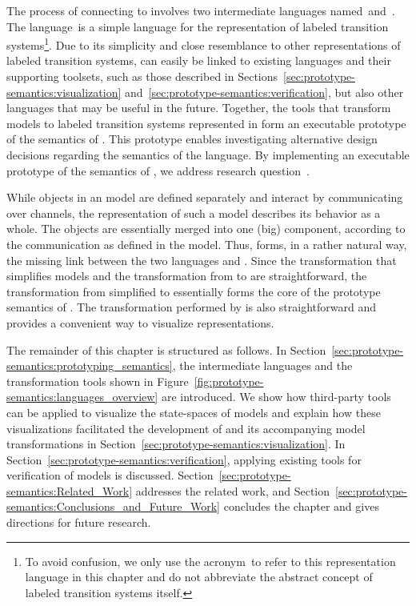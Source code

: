 The process of connecting \SLCO to \DOT involves two intermediate languages named~\CS and~\LTS.
The language~\LTS is a simple language for the representation of labeled transition systems\footnote{To avoid confusion, we only use the acronym~\LTS to refer to this representation language in this chapter and do not abbreviate the abstract concept of labeled transition systems itself.}.
Due to its simplicity and close resemblance to other representations of labeled transition systems, \LTS can easily be linked to existing languages and their supporting toolsets, such as those described in Sections~\ref{sec:prototype-semantics:visualization} and~\ref{sec:prototype-semantics:verification}, but also other languages that may be useful in the future.
Together, the tools that transform \SLCO models to labeled transition systems represented in \LTS form an executable prototype of the semantics of \SLCO.
This prototype enables investigating alternative design decisions regarding the semantics of the language.
By implementing an executable prototype of the semantics of \SLCO, we address research question~.

\RQThree

While objects in an \SLCO model are defined separately and interact by communicating over channels, the \CS representation of such a model describes its behavior as a whole.
The objects are essentially merged into one (big) component, according to the communication as defined in the \SLCO model.
Thus, \CS forms, in a rather natural way, the missing link between the two languages \SLCO and \LTS.
Since the transformation that simplifies \SLCO models and the transformation from \CS to \LTS are straightforward, the transformation from simplified \SLCO to \CS essentially forms the core of the prototype semantics of \SLCO.
The transformation performed by \CStoDot is also straightforward and provides a convenient way to visualize \CS representations.

The remainder of this chapter is structured as follows.
In Section~\ref{sec:prototype-semantics:prototyping_semantics}, the intermediate languages and the transformation tools shown in Figure~\ref{fig:prototype-semantics:languages_overview} are introduced.
We show how third-party tools can be applied to visualize the state-spaces of \SLCO models and explain how these visualizations facilitated the development of \SLCO and its accompanying model transformations in Section~\ref{sec:prototype-semantics:visualization}.
In Section~\ref{sec:prototype-semantics:verification}, applying existing tools for verification of \SLCO models is discussed.
Section~\ref{sec:prototype-semantics:Related_Work} addresses the related work, and Section~\ref{sec:prototype-semantics:Conclusions_and_Future_Work} concludes the chapter and gives directions for future research.
